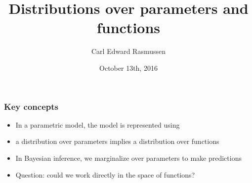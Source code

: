 

\title{Distributions over parameters and functions}
\author{Carl Edward Rasmussen}
\date{October 13th, 2016}



\begin{frame}
\titlepage
\end{frame}

\begin{frame}
\frametitle{Key concepts}

\begin{itemize}
\item In a parametric model, the model is represented using 
\item a distribution over parameters implies a distribution over functions
\item In Bayesian inference, we marginalize over parameters to make predictions
\item Question: could we work directly in the space of functions?
\end{itemize}
\end{frame}


